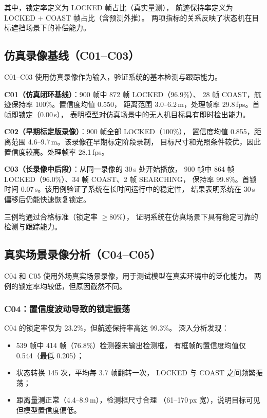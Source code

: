 \documentclass[12pt, a4paper]{ctexart}
\begin{document}
其中，锁定率定义为 LOCKED 帧占比（真实量测），
航迹保持率定义为 LOCKED + COAST 帧占比（含预测外推）。
两项指标的关系反映了状态机在目标遮挡场景下的补偿能力。

\subsection{仿真录像基线（C01--C03）}

C01--C03 使用仿真录像作为输入，验证系统的基本检测与跟踪能力。

\textbf{C01（仿真闭环基线）}：900 帧中 872 帧 LOCKED（96.9\%）、
28 帧 COAST，航迹保持率 100\%。置信度均值 0.550，
距离范围 3.0--6.2\,m，处理帧率 29.8\,fps。首帧即锁定（0.00\,s），
表明模型对仿真场景中的无人机目标具有即时检出能力。

\textbf{C02（早期标定版录像）}：900 帧全部 LOCKED（100\%），
置信度均值 0.855，距离范围 4.6--9.7\,m。该录像在早期标定阶段录制，
目标尺寸和光照条件较优，因此置信度较高。处理帧率 28.1\,fps。

\textbf{C03（长录像中后段）}：从同一录像的 30\,s 处开始播放，
900 帧中 864 帧 LOCKED（96.0\%）、34 帧 COAST、2 帧 SEARCHING，
保持率 99.8\%。首锁时间 0.07\,s。该用例验证了系统在长时间运行中的稳定性，
结果表明系统在 30\,s 偏移后仍能快速恢复锁定。

三例均通过合格标准（锁定率 $\geq 80\%$），
证明系统在仿真场景下具有稳定可靠的检测与跟踪能力。

\subsection{真实场景录像分析（C04--C05）}
\label{subsec:real_scenario}

C04 和 C05 使用外场真实场景录像，用于测试模型在真实环境中的泛化能力。
两例的锁定率均较低，但原因截然不同。

\subsubsection{C04：置信度波动导致的锁定振荡}

C04 的锁定率仅为 23.2\%，但航迹保持率高达 99.3\%。
深入分析发现：

\begin{itemize}
  \item 539 帧中 414 帧（76.8\%）检测器未输出检测框，
        有框帧的置信度均值仅 0.544（最低 0.205）；
  \item 状态转换 145 次，平均每 3.7 帧翻转一次，
        LOCKED 与 COAST 之间频繁振荡；
  \item 距离量测正常（4.4--8.9\,m），检测框尺寸合理
        （61--170\,px 宽），说明目标可见但模型置信度偏低。
\end{itemize}
\end{document}
